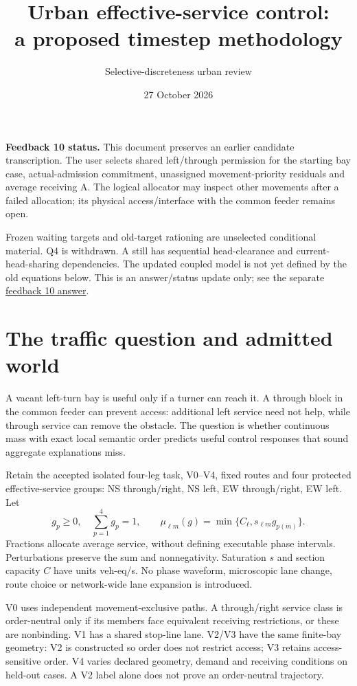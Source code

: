 \documentclass[10pt,a4paper]{article}
\title{Urban effective-service control:\\a proposed timestep methodology}
\author{Selective-discreteness urban review}
\date{27 October 2026}
\begin{document}
\maketitle

\textbf{Feedback 10 status.}
This document preserves an earlier candidate transcription. The user selects
shared left/through permission for the starting bay case, actual-admission
commitment, unassigned movement-priority residuals and average receiving A.
The logical allocator may inspect other movements after a failed allocation;
its physical access/interface with the common feeder remains open.

Frozen waiting targets and old-target rationing are unselected conditional
material. Q4 is withdrawn. A still has sequential head-clearance and
current-head-sharing dependencies. The updated coupled model is not yet
defined by the old equations below. This is an answer/status update only;
see the separate \href{urban_feedback10_response.md}{feedback 10 answer}.

\section{The traffic question and admitted world}

A vacant left-turn bay is useful only if a turner can reach it. A through
block in the common feeder can prevent access: additional left service need
not help, while through service can remove the obstacle. The question is
whether continuous mass with exact local semantic order predicts useful
control responses that sound aggregate explanations miss.

Retain the accepted isolated four-leg task, V0--V4, fixed routes and four
protected effective-service groups: NS through/right, NS left, EW through/right,
EW left. Let
\begin{equation}
 g_p\geq0,\quad \sum_{p=1}^4g_p=1,\qquad
 \mu_{\ell m}(g)=\min\{C_\ell,s_{\ell m}g_{p(m)}\}.
 \label{eq:action-new}
\end{equation}
Fractions allocate average service, without defining executable phase
intervals. Perturbations preserve the sum and nonnegativity. Saturation $s$
and section capacity $C$ have units veh-eq/s. No phase waveform, microscopic
lane change, route choice or network-wide lane expansion is introduced.

V0 uses independent movement-exclusive paths. A through/right service class
is order-neutral only if its members face equivalent receiving restrictions,
or these are nonbinding. V1 has a shared stop-line lane. V2/V3 have the same
finite-bay geometry: V2 is constructed so order does not restrict access;
V3 retains access-sensitive order. V4 varies declared geometry, demand and
receiving conditions on held-out cases. A V2 label alone does not prove an
order-neutral trajectory.
\end{document}

